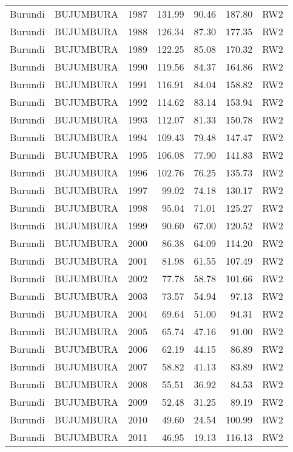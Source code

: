 \begin{longtable}{lllrrrl}
  Burundi & BUJUMBURA & 1987 & 131.99 & 90.46 & 187.80 & RW2 \\ 
  Burundi & BUJUMBURA & 1988 & 126.34 & 87.30 & 177.35 & RW2 \\ 
  Burundi & BUJUMBURA & 1989 & 122.25 & 85.08 & 170.32 & RW2 \\ 
  Burundi & BUJUMBURA & 1990 & 119.56 & 84.37 & 164.86 & RW2 \\ 
  Burundi & BUJUMBURA & 1991 & 116.91 & 84.04 & 158.82 & RW2 \\ 
  Burundi & BUJUMBURA & 1992 & 114.62 & 83.14 & 153.94 & RW2 \\ 
  Burundi & BUJUMBURA & 1993 & 112.07 & 81.33 & 150.78 & RW2 \\ 
  Burundi & BUJUMBURA & 1994 & 109.43 & 79.48 & 147.47 & RW2 \\ 
  Burundi & BUJUMBURA & 1995 & 106.08 & 77.90 & 141.83 & RW2 \\ 
  Burundi & BUJUMBURA & 1996 & 102.76 & 76.25 & 135.73 & RW2 \\ 
  Burundi & BUJUMBURA & 1997 & 99.02 & 74.18 & 130.17 & RW2 \\ 
  Burundi & BUJUMBURA & 1998 & 95.04 & 71.01 & 125.27 & RW2 \\ 
  Burundi & BUJUMBURA & 1999 & 90.60 & 67.00 & 120.52 & RW2 \\ 
  Burundi & BUJUMBURA & 2000 & 86.38 & 64.09 & 114.20 & RW2 \\ 
  Burundi & BUJUMBURA & 2001 & 81.98 & 61.55 & 107.49 & RW2 \\ 
  Burundi & BUJUMBURA & 2002 & 77.78 & 58.78 & 101.66 & RW2 \\ 
  Burundi & BUJUMBURA & 2003 & 73.57 & 54.94 & 97.13 & RW2 \\ 
  Burundi & BUJUMBURA & 2004 & 69.64 & 51.00 & 94.31 & RW2 \\ 
  Burundi & BUJUMBURA & 2005 & 65.74 & 47.16 & 91.00 & RW2 \\ 
  Burundi & BUJUMBURA & 2006 & 62.19 & 44.15 & 86.89 & RW2 \\ 
  Burundi & BUJUMBURA & 2007 & 58.82 & 41.13 & 83.89 & RW2 \\ 
  Burundi & BUJUMBURA & 2008 & 55.51 & 36.92 & 84.53 & RW2 \\ 
  Burundi & BUJUMBURA & 2009 & 52.48 & 31.25 & 89.19 & RW2 \\ 
  Burundi & BUJUMBURA & 2010 & 49.60 & 24.54 & 100.99 & RW2 \\ 
  Burundi & BUJUMBURA & 2011 & 46.95 & 19.13 & 116.13 & RW2 \\ 

\end{longtable}
